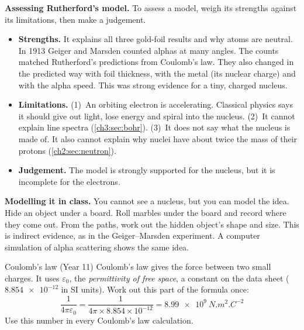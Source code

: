 \textbf{Assessing Rutherford's model.} To assess a model, weigh its strengths
against its limitations, then make a judgement.
\begin{itemize}
  \item \textbf{Strengths.} It explains all three gold-foil results and why atoms
        are neutral. In 1913 Geiger and Marsden counted alphas at many angles.
        The counts matched Rutherford's predictions from Coulomb's law. They also
        changed in the predicted way with foil thickness, with the metal (its
        nuclear charge) and with the alpha speed. This was strong evidence for a
        tiny, charged nucleus.
  \item \textbf{Limitations.} (1)~An orbiting electron is accelerating. Classical
        physics says it should give out light, lose energy and spiral into the
        nucleus. (2)~It cannot explain line spectra (\cref{ch3:sec:bohr}). (3)~It does
        not say what the nucleus is made of. It also cannot explain why nuclei
        have about twice the mass of their protons (\cref{ch2:sec:neutron}).
  \item \textbf{Judgement.} The model is strongly supported for the nucleus, but
        it is incomplete for the electrons.
\end{itemize}

\textbf{Modelling it in class.} You cannot see a nucleus, but you can model the
idea. Hide an object under a board. Roll marbles under the board and record
where they come out. From the paths, work out the hidden object's shape and
size. This is indirect evidence, as in the Geiger--Marsden experiment. A
computer simulation of alpha scattering shows the same idea.

\begin{refresher}{Coulomb's law (Year 11)}
Coulomb's law gives the force between two small charges. It uses
$\varepsilon_0$, the \emph{permittivity of free space}, a constant on the data
sheet ($\num{8.854e-12}$ in SI units). Work out this part of the formula once:
\[ \frac{1}{4\pi\varepsilon_0} = \frac{1}{4\pi\times8.854\times10^{-12}}
= \qty{8.99e9}{N.m^2.C^{-2}} \]
Use this number in every Coulomb's law calculation.
\end{refresher}

